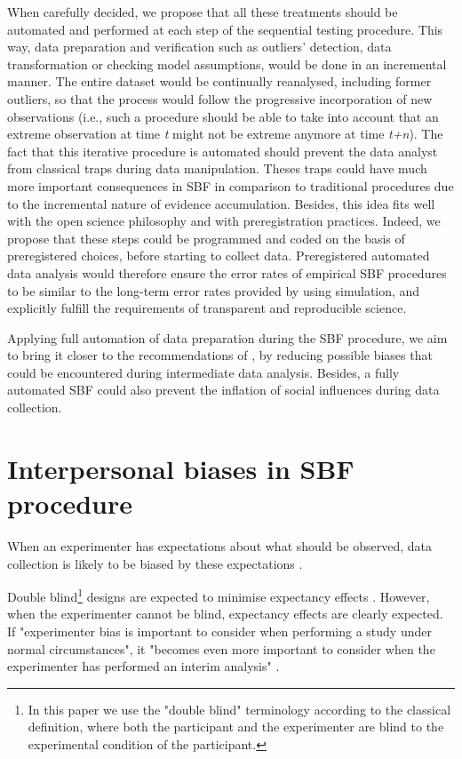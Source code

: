 \documentclass[a4paper,man,natbib,floatsintext,donotrepeattitle]{apa6}
\begin{document}
When carefully decided, we propose that all these treatments should be automated and performed at each step of the sequential testing procedure. This way, data preparation and verification such as outliers' detection, data transformation or checking model assumptions, would be done in an incremental manner. The entire dataset would be continually reanalysed, including former outliers, so that the process would follow the progressive incorporation of new observations (i.e., such a procedure should be able to take into account that an extreme observation at time \textit{t} might not be extreme anymore at time \textit{t+n}). The fact that this iterative procedure is automated should prevent the data analyst from classical traps during data manipulation. Theses traps could have much more important consequences in SBF in comparison to traditional procedures due to the incremental nature of evidence accumulation. Besides, this idea fits well with the open science philosophy and with preregistration practices. Indeed, we propose that these steps could be programmed and coded on the basis of preregistered choices, before starting to collect data. Preregistered automated data analysis would therefore ensure the error rates of empirical SBF procedures to be similar to the long-term error rates provided by \cite{schonbrodt_sequential_2017} using simulation, and explicitly fulfill the requirements of transparent and reproducible science. \par

Applying full automation of data preparation during the SBF procedure, we aim to bring it closer to the recommendations of \cite{schonbrodt_sequential_2017}, by reducing possible biases that could be encountered during intermediate data analysis. Besides, a fully automated SBF could also prevent the inflation of social influences during data collection.

\section{Interpersonal biases in SBF procedure}

When an experimenter has expectations about what should be observed, data collection is likely to be biased by these expectations \citep{orne_social_1962,rosenthal_social_1963,rosenthal_experimenter_1964,rosenthal_interpersonal_1978,zoble_interaction_1969,klein_low_2012,gilder_role_2018}.

Double blind\footnote{In this paper we use the "double blind" terminology according to the classical definition, where both the participant and the experimenter are blind to the experimental condition of the participant.} designs are expected to minimise expectancy effects \citep{klein_low_2012,gilder_role_2018}. However, when the experimenter cannot be blind, expectancy effects are clearly expected. If "experimenter bias is important to consider when
performing a study under normal circumstances", it "becomes even more important to consider
when the experimenter has performed an interim analysis" \citep{lakens_performing_2014}. \par
\end{document}
